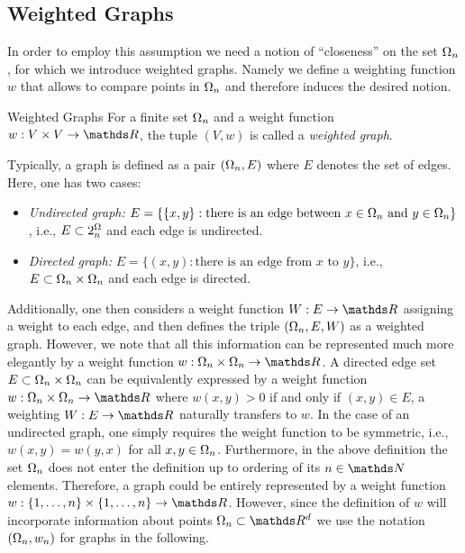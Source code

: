 \subsection{Weighted Graphs}
In order to employ this assumption we need a notion of \enquote{closeness} on the set $\Omega_n$, for which we introduce weighted graphs. Namely we define a weighting function $w$ that allows to compare points in $\Omega_n$ and therefore induces the desired notion. 
%
\begin{definition}{Weighted Graphs}{}
For a finite set $\Omega_n$ and a weight function $w:V\times V\to\R$, the tuple $(V,w)$ is called a \emph{weighted graph}.
\end{definition}
%
\begin{remark}{}{}
Typically, a graph is defined as a pair $(\Omega_n,E)$ where $E$ denotes the set of edges. Here, 
one has two cases:
\begin{itemize}
\item \emph{Undirected graph:} $E=\{ \{x,y\}: \text{there is an edge between } x\in \Omega_n \text{ and } y\in \Omega_n\}$, i.e., 
$E\subset 2^\Omega_n$ and each edge is undirected.
%
\item \emph{Directed graph:} $E=\{ (x,y): \text{there is an edge from } x \text{ to } y\}$, i.e.,
$E\subset \Omega_n\times \Omega_n$ and each edge is directed.
%
\end{itemize}
Additionally, one then considers a weight function $W:E\to\R$ assigning a weight to each edge, and then defines 
the triple $(\Omega_n,E,W)$ as a weighted graph. However, we note that all this information can be represented much more elegantly by a weight function $w:\domain_n\times \domain_n\to\R$. A directed edge set $E\subset \Omega_n\times \Omega_n$ can be equivalently expressed by 
a weight function $w:\domain_n\times \domain_n\to\R$ where $w(x,y)>0$ if and only if $(x,y)\in E$, a weighting $W:E\to\R$ 
naturally transfers to $w$. In the case of an undirected graph, one simply requires the weight function to be symmetric, i.e., 
$w(x,y)=w(y,x)$ for all $x,y\in \Omega_n$.
%
Furthermore, in the above definition the set $\Omega_n$ does not enter the definition up to ordering of its $n\in \N$  elements. Therefore, a graph could be entirely represented by a weight function $w:\{1,\ldots,n\}\times\{1,\ldots,n\}\to\R$. However, since the definition of $w$ will incorporate information about points $\domain_n\subset\R^d$ we use the notation $(\Omega_n, w_n)$ for graphs in the following.
\end{remark}
%
%
%
